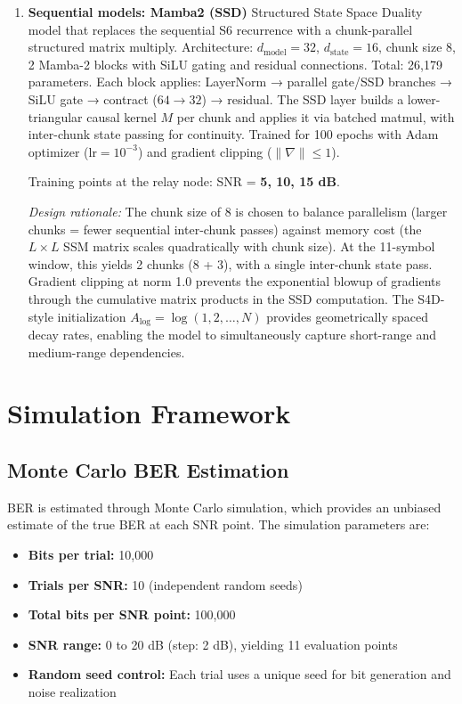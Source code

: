 \begin{enumerate}
\item \textbf{Sequential models: Mamba2 (SSD)} Structured State Space Duality model that replaces the sequential S6 recurrence with a chunk-parallel structured matrix multiply. Architecture: \(d_{\text{model}}=32\), \(d_{\text{state}}=16\), chunk size 8, 2 Mamba-2 blocks with SiLU gating and residual connections. Total: 26,179 parameters. Each block applies: LayerNorm → parallel gate/SSD branches → SiLU gate → contract (\(64 \to 32\)) → residual. The SSD layer builds a lower-triangular causal kernel \(M\) per chunk and applies it via batched matmul, with inter-chunk state passing for continuity. Trained for 100 epochs with Adam optimizer (\(\text{lr}=10^{-3}\)) and gradient clipping (\(\|\nabla\| \le 1\)).

  Training points at the relay node: SNR = \textbf{5, 10, 15 dB}.

  \emph{Design rationale:} The chunk size of 8 is chosen to balance parallelism (larger chunks = fewer sequential inter-chunk passes) against memory cost (the \(L \times L\) SSM matrix scales quadratically with chunk size). At the 11-symbol window, this yields 2 chunks (8 + 3), with a single inter-chunk state pass. Gradient clipping at norm 1.0 prevents the exponential blowup of gradients through the cumulative matrix products in the SSD computation. The S4D-style initialization \(A_{\text{log}} = \log(1, 2, \dots, N)\) provides geometrically spaced decay rates, enabling the model to simultaneously capture short-range and medium-range dependencies.

\end{enumerate}

\section{Simulation Framework}\label{sec:simulation-framework}

\subsection{Monte Carlo BER Estimation}\label{sec:monte-carlo-ber-estimation}

BER is estimated through Monte Carlo simulation, which provides an unbiased estimate of the true BER at each SNR point. The simulation parameters are:

\begin{itemize}
\tightlist
\item
  \textbf{Bits per trial:} 10,000
\item
  \textbf{Trials per SNR:} 10 (independent random seeds)
\item
  \textbf{Total bits per SNR point:} 100,000
\item
  \textbf{SNR range:} 0 to 20 dB (step: 2 dB), yielding 11 evaluation points
\item
  \textbf{Random seed control:} Each trial uses a unique seed for bit generation and noise realization
\end{itemize}

